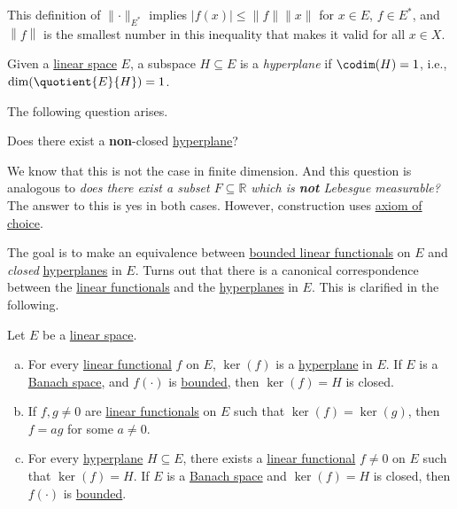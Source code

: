 This definition of \(\lVert \cdot \rVert _{E^{\ast} }\) implies \(\vert f(x) \vert \leq \lVert f \rVert \lVert x \rVert\) for \(x\in E\), \(f\in E^{\ast} \), and \(\left\lVert f\right\rVert \) is the smallest number in this inequality that makes it valid for all \(x\in X\).

\begin{definition}[Hyperplane]\label{def:hyperplane}
	Given a \hyperref[def:linear-vector-space]{linear space} \(E\), a subspace \(H\subseteq E\) is a \emph{hyperplane} if \(\codim(H)=1\), i.e., \(\dim (\quotient{E}{H})=1\).
\end{definition}

The following question arises.

\begin{problem}
Does there exist a \textbf{non}-closed \hyperref[def:hyperplane]{hyperplane}?
\end{problem}
\begin{answer}
	We know that this is not the case in finite dimension. And this question is analogous to \emph{does there exist a subset \(F\subseteq \mathbb{R} \) which is \textbf{not} Lebesgue measurable?} The answer to this is yes in both cases. However, construction uses \href{https://en.wikipedia.org/wiki/Axiom_of_choice}{axiom of choice}.
\end{answer}

The goal is to make an equivalence between \hyperref[def:bounded-linear-functional]{bounded linear functionals} on \(E\) and \emph{closed} \hyperref[def:hyperplane]{hyperplanes} in \(E\). Turns out that there is a canonical correspondence between the \hyperref[def:linear-functional]{linear functionals} and the \hyperref[def:hyperplane]{hyperplanes} in \(E\). This is clarified in the following.

\begin{proposition}\label{prop:linear-functionals-and-hyperplanes}
	Let \(E\) be a \hyperref[def:linear-vector-space]{linear space}.
	\begin{enumerate}[(a)]
		\item For every \hyperref[def:linear-functional]{linear functional} \(f\) on \(E\), \(\ker(f)\) is a \hyperref[def:hyperplane]{hyperplane} in \(E\). If \(E\) is a \hyperref[def:Banach-space]{Banach space}, and \(f(\cdot)\) is \hyperref[def:bounded-linear-functional]{bounded}, then \(\ker(f) = H\) is closed.
		\item If \(f, g \neq 0\) are \hyperref[def:linear-functional]{linear functionals} on \(E\) such that \(\ker(f) = \ker(g)\), then \(f = ag\) for some \(a \neq 0\).
		\item For every \hyperref[def:hyperplane]{hyperplane} \(H\subseteq E\), there exists a \hyperref[def:linear-functional]{linear functional} \(f \neq 0\) on \(E\) such that \(\ker(f) = H\). If \(E\) is a \hyperref[def:Banach-space]{Banach space} and \(\ker(f) = H\) is closed, then \(f(\cdot)\) is \hyperref[def:bounded-linear-functional]{bounded}.
	\end{enumerate}
\end{proposition}